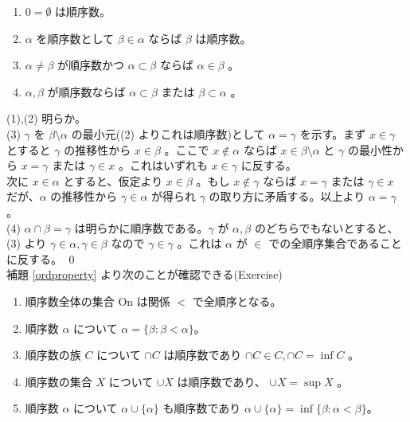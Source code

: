 \documentclass[dvipdfmx,a4paper]{jsreport}
\theoremstyle{definition}
\begin{document}
\lem\label{ordproperty}
\begin{enumerate}
    \item $0=\emptyset$ は順序数。
    \item $\alpha$ を順序数として $\beta \in \alpha$ ならば $\beta$ は順序数。
    \item $\alpha \neq \beta$ が順序数かつ $\alpha \subset \beta$ ならば $\alpha \in \beta$ 。
    \item $\alpha,\beta$ が順序数ならば $\alpha \subset \beta$ または $\beta \subset \alpha$ 。   
\end{enumerate}
\prf (1),(2) 明らか。 \\
(3) $\gamma$ を $\beta \setminus \alpha$ の最小元((2) よりこれは順序数)として $\alpha=\gamma$ を示す。まず $x \in \gamma$ とすると $\gamma$ の推移性から $x \in \beta$ 。ここで $x \notin \alpha$ ならば $x \in \beta \setminus \alpha$ と $\gamma$ の最小性から $x=\gamma$ または $\gamma \in x$ 。これはいずれも $x \in \gamma$ に反する。\\
次に $x \in \alpha$ とすると、仮定より $x \in \beta$ 。もし $x \notin \gamma$ ならば $x=\gamma$ または $\gamma \in x$ だが、$\alpha$ の推移性から $\gamma \in \alpha$ が得られ $\gamma$ の取り方に矛盾する。以上より $\alpha=\gamma$ 。
\\
(4) $\alpha \cap \beta=\gamma$ は明らかに順序数である。$\gamma$ が $\alpha,\beta$ のどちらでもないとすると、(3) より $\gamma \in \alpha,\gamma \in \beta$ なので $\gamma \in \gamma$ 。これは $\alpha$ が $\in$ での全順序集合であることに反する。  \qed
\\

補題 \ref{ordproperty} より次のことが確認できる(Exercise)
\begin{enumerate}
    \item 順序数全体の集合 $\mbox{On}$ は関係 $<$ で全順序となる。
    \item 順序数 $\alpha$ について $\alpha=\{\beta \colon \beta<\alpha\}$。
    \item 順序数の族 $C$ について $\cap C$ は順序数であり $\cap C \in C,\cap C=\inf C$ 。
    \item 順序数の集合 $X$ について $\cup X$ は順序数であり、 $\cup X=\sup X$ 。
    \item 順序数 $\alpha$ について $\alpha \cup \{\alpha\}$ も順序数であり $\alpha \cup \{\alpha\}=\inf\{\beta \colon \alpha<\beta\}$。
\end{enumerate}
\end{document}
